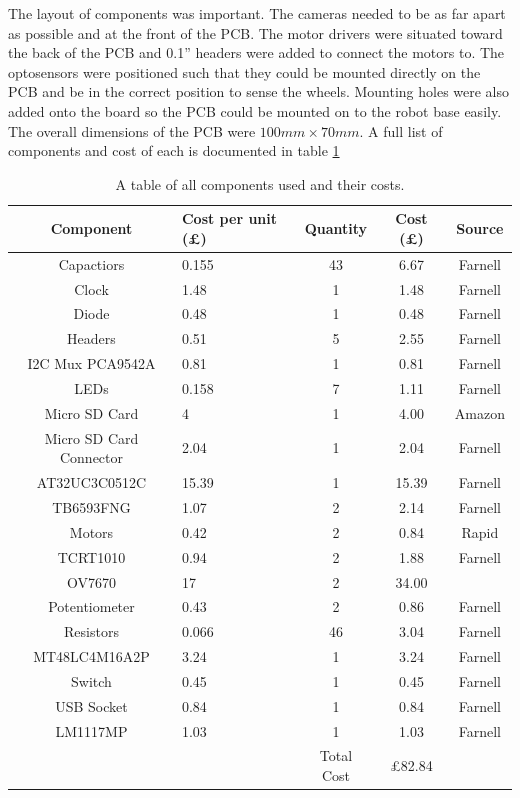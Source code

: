 The layout of components was important. The cameras needed to be as far apart as possible and at the front of the PCB. The motor drivers were situated toward the back of the PCB and 0.1'' headers were added to connect the motors to. The optosensors were positioned such that they could be mounted directly on the PCB and be in the correct position to sense the wheels. Mounting holes were also added onto the board so the PCB could be mounted on to the robot base easily. The overall dimensions of the PCB were $100mm \times 70mm$. A full list of components and cost of each is documented in table \ref{table:Costings}


\begin{table}
\centering
\begin{tabular}{|c|p{2cm}|c|c|c|} \hline
Component	&	Cost per unit (\pounds)	& Quantity 	&	Cost (\pounds)	&	Source		\\ \hline
Capactiors	&	0.155 					& 	43		& 	6.67 					& 	Farnell 	\\
Clock 		& 	1.48					& 	1		&	1.48 					& 	Farnell		\\
Diode		&	0.48					&	1		&	0.48					&	Farnell 	\\
Headers		&	0.51 					&	5		&	2.55					&	Farnell 	\\
I2C Mux PCA9542A &	0.81				&	1		&	0.81					&	Farnell		\\
LEDs 		&	0.158					&	7		& 	1.11 					&	Farnell		\\
Micro SD Card &	4						&	1		&	4.00 					&	Amazon 		\\
Micro SD Card Connector & 2.04			&	1		&	2.04					&	Farnell		\\
AT32UC3C0512C	&15.39					&	1		&	15.39					&	Farnell		\\
TB6593FNG 	&	1.07 					&	2 		&	2.14 					&	Farnell 	\\
Motors  	&	0.42					&	2		&	0.84				 	&	Rapid 		\\
TCRT1010	& 	0.94 					&	2		&	1.88 					&	Farnell 	\\
OV7670		&	17						&	2		&	34.00					& 				\\
Potentiometer	&	0.43				&	2		&	0.86					&	Farnell 	\\
Resistors	&	0.066 					& 	46		&	3.04 					&	Farnell 	\\
MT48LC4M16A2P	& 3.24  				& 	1		&	3.24 					&	Farnell		\\
Switch		&	0.45					&	1		&	0.45					&	Farnell 	\\
USB Socket	&	0.84 					&	1		& 	0.84 					&	Farnell 	\\
LM1117MP	&	1.03					&	1		&	1.03	 				&	Farnell		\\ \hline \cline{3-4}
\multicolumn{2}{c|}{ }					& Total Cost  & \pounds 82.84			&	\multicolumn{1}{|c}{ }			\\ \cline{3-4}
\end{tabular}
\caption{A table of all components used and their costs.}
\label{table:Costings}
\end{table}

